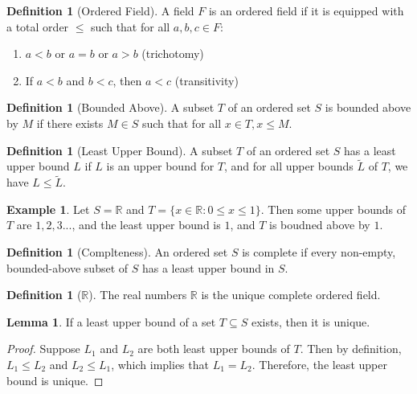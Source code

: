 \documentclass[letterpaper, 11pt]{article}
\newcommand{\R}{\mathbb{R}}   %
\newcommand{\1}{\mathds{1}}		%
\theoremstyle{definition}
\newtheorem{lemma}[theorem]{Lemma}
\newtheorem{definition}[theorem]{Definition}
\newtheorem{example}[theorem]{Example}
\begin{document}
\begin{definition}[Ordered Field]
    A field $F$ is an ordered field if it is equipped with a total order $\leq$ such that for all $a,b,c \in F$:
    \begin{enumerate}
        \item $a < b$ or $a = b$ or $a > b$ (trichotomy)
        \item If $a < b$ and $b < c$, then $a < c$ (transitivity)
    \end{enumerate}
\end{definition}

\begin{definition}[Bounded Above]
    A subset $T$ of an ordered set $S$ is bounded above by $M$ if there exists $M \in S$ such that for all $x \in T, x \leq M$.
\end{definition}

\begin{definition}[Least Upper Bound]
    A subset $T$ of an ordered set $S$ has a least upper bound $L$ if $L$ is an upper bound for $T$, and for all upper bounds $\tilde{L}$ of $T$, we have $L \leq \tilde{L}$.

\end{definition}

\begin{example}
    Let $S = \R$ and $T = \{x \in \R : 0 \leq x \leq 1\}$. Then some upper bounds of $T$ are $1, 2, 3 ...$, and the least upper bound is $1$, and $T$ is boudned above by $1$.
\end{example}

\begin{definition}[Complteness]
    An ordered set $S$ is complete if every non-empty, bounded-above subset of $S$ has a least upper bound in $S$.
\end{definition}

\begin{definition}[$\R$]
    The real numbers $\R$ is the unique complete ordered field.
\end{definition}

\begin{lemma}
    If a least upper bound of a set $T \subseteq S$ exists, then it is unique.
\end{lemma}
\begin{proof}
    Suppose $L_1$ and $L_2$ are both least upper bounds of $T$. Then by definition, $L_1 \leq L_2$ and $L_2 \leq L_1$, which implies that $L_1 = L_2$. Therefore, the least upper bound is unique.
\end{proof}
\end{document}

